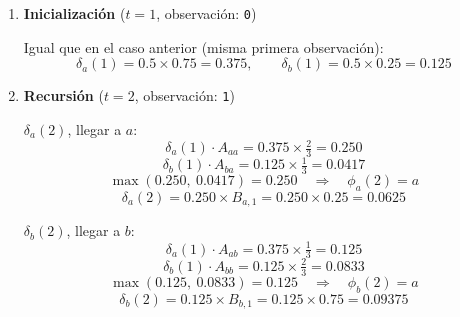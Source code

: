 \begin{enumerate}
  
\item \textbf{Inicialización} ($t=1$, observación: \texttt{0})
  
  Igual que en el caso anterior (misma primera observación):
  \[
  \delta_a(1) = 0.5 \times 0.75 = \mathbf{0.375}, \qquad
  \delta_b(1) = 0.5 \times 0.25 = \mathbf{0.125}
  \]
  
  \begin{center}
  \end{center}
  
\item \textbf{Recursión} ($t=2$, observación: \texttt{1})
  
  $\delta_a(2)$, llegar a $a$:
  \[
  \delta_a(1)\cdot A_{aa} = 0.375 \times \tfrac{2}{3} = 0.250
  \]
  \[
  \delta_b(1)\cdot A_{ba} = 0.125 \times \tfrac{1}{3} = 0.0417
  \]
  \[
  \max(0.250,\ 0.0417) = 0.250 \quad\Rightarrow\quad \phi_a(2) = a
  \]
  \[
  \delta_a(2) = 0.250 \times B_{a,1} = 0.250 \times 0.25 = \mathbf{0.0625}
  \]
  
  $\delta_b(2)$, llegar a $b$:
  \[
  \delta_a(1)\cdot A_{ab} = 0.375 \times \tfrac{1}{3} = 0.125
  \]
  \[
  \delta_b(1)\cdot A_{bb} = 0.125 \times \tfrac{2}{3} = 0.0833
  \]
  \[
  \max(0.125,\ 0.0833) = 0.125 \quad\Rightarrow\quad \phi_b(2) = a
  \]
  \[
  \delta_b(2) = 0.125 \times B_{b,1} = 0.125 \times 0.75 = \mathbf{0.09375}
  \]
  
  \begin{center}
\end{center}
\end{enumerate}
